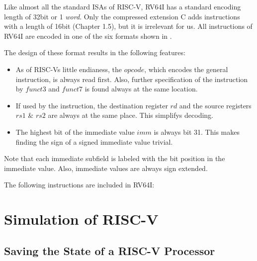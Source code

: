 Like almost all the standard ISAs of RISC-V, RV64I has a standard encoding
length of 32bit or 1 \emph{word}. Only the compressed extension C adds
instructions with a length of 16bit \cite{riscv-isa}(Chapter 1.5), but it is
irrelevant for us. All instructions of RV64I are encoded in one of the six
formats shown in .



The design of these format results in the following features:
\begin{itemize}
    \item As of RISC-Vs little endianess, the $opcode$, which encodes the general
          instruction, is always read first. Also, further specification of the
          instruction by $funct3$ and $funct7$ is found always at the same location.
    \item If used by the instruction, the destination register $rd$ and the source
          registers $rs1$ \& $rs2$ are always at the same place. This simplifys decoding.
    \item The highest bit of the immediate value $imm$ is always bit 31. This makes
          finding the sign of a signed immediate value trivial.
\end{itemize}
Note that each immediate subfield is labeled with the bit position in the immediate value.
Also, immediate values are always sign extended.

The following instructions are included in RV64I:

\section{Simulation of RISC-V}

\subsection{Saving the State of a RISC-V Processor}\label{statefile}